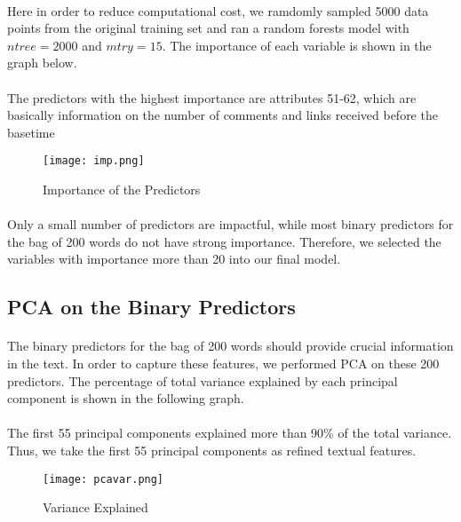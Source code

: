 \documentclass[paper=a4, fontsize=11pt]{scrartcl} %
\numberwithin{equation}{section} %
\numberwithin{figure}{section} %
\numberwithin{table}{section} %
\begin{document}
{\paragraph{}
Here in order to reduce computational cost, we ramdomly sampled 5000 data points from the original training set and ran a random forests model with \(ntree = 2000\) and \(mtry = 15\). The importance of each variable is shown in the graph below.
\paragraph{}
The predictors with the highest importance are attributes 51-62, which are basically information on the number of comments and links received before the basetime

\begin{figure}[H]
    \centering
        \texttt{[image: imp.png]} 
        \caption{Importance of the Predictors}
\end{figure}

\paragraph{}
Only a small number of predictors are impactful, while most binary predictors for the bag of 200 words do not have strong importance. Therefore, we selected the variables with importance more than 20 into our final model.

\subsection{PCA on the Binary Predictors}
\paragraph{}
The binary predictors for the bag of 200 words should provide crucial information in the text. In order to capture these features, we performed PCA on these 200 predictors. The percentage of total variance explained by each principal component is shown in the following graph.
\paragraph{}
The first 55 principal components explained more than 90\% of the total variance. Thus, we take the first 55 principal components as refined textual features.

\begin{figure}[H]
    \centering
        \texttt{[image: pcavar.png]} 
        \caption{Variance Explained}
\end{figure}

}
\end{document}
